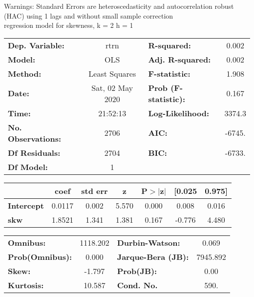 Warnings: \newline
 [1] Standard Errors are heteroscedasticity and autocorrelation robust (HAC) using 1 lags and without small sample correction\\ 

regression model for skewness, k = 2 h = 1\begin{center}
\begin{tabular}{lclc}
\toprule
\textbf{Dep. Variable:}    &       rtrn       & \textbf{  R-squared:         } &     0.002   \\
\textbf{Model:}            &       OLS        & \textbf{  Adj. R-squared:    } &     0.002   \\
\textbf{Method:}           &  Least Squares   & \textbf{  F-statistic:       } &     1.908   \\
\textbf{Date:}             & Sat, 02 May 2020 & \textbf{  Prob (F-statistic):} &    0.167    \\
\textbf{Time:}             &     21:52:13     & \textbf{  Log-Likelihood:    } &    3374.3   \\
\textbf{No. Observations:} &        2706      & \textbf{  AIC:               } &    -6745.   \\
\textbf{Df Residuals:}     &        2704      & \textbf{  BIC:               } &    -6733.   \\
\textbf{Df Model:}         &           1      & \textbf{                     } &             \\
\bottomrule
\end{tabular}
\begin{tabular}{lcccccc}
                   & \textbf{coef} & \textbf{std err} & \textbf{z} & \textbf{P$> |$z$|$} & \textbf{[0.025} & \textbf{0.975]}  \\
\midrule
\textbf{Intercept} &       0.0117  &        0.002     &     5.570  &         0.000        &        0.008    &        0.016     \\
\textbf{skw}       &       1.8521  &        1.341     &     1.381  &         0.167        &       -0.776    &        4.480     \\
\bottomrule
\end{tabular}
\begin{tabular}{lclc}
\textbf{Omnibus:}       & 1118.202 & \textbf{  Durbin-Watson:     } &    0.069  \\
\textbf{Prob(Omnibus):} &   0.000  & \textbf{  Jarque-Bera (JB):  } & 7945.892  \\
\textbf{Skew:}          &  -1.797  & \textbf{  Prob(JB):          } &     0.00  \\
\textbf{Kurtosis:}      &  10.587  & \textbf{  Cond. No.          } &     590.  \\
\bottomrule
\end{tabular}
\end{center}

